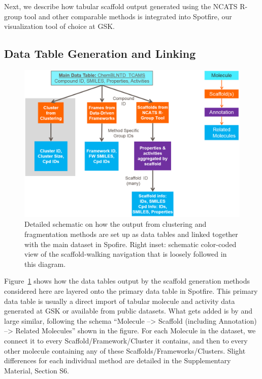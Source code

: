 \documentclass[journal=jacsat,manuscript=article]{achemso}
\newcommand*\fref[1]{Figure~\ref{fig:#1}}
\begin{document}
Next, we describe how tabular scaffold output generated using the
NCATS R-group tool and other comparable methods is integrated into
Spotfire, our visualization tool of choice at GSK. 

\subsection{Data Table Generation and Linking}

\begin{figure}
\includegraphics[width=6in]{fig/details_all3_noSNG.png}
\caption{Detailed schematic on how the output from clustering and
  fragmentation methods are set up as data tables and linked together
  with the main dataset in Spofire. Right inset: schematic color-coded
  view of the scaffold-walking navigation that is loosely followed in
  this diagram.}
\label{fig:detaildevil}
\end{figure}

\fref{detaildevil} shows how the data tables output by the scaffold
generation methods considered here are layered onto the primary data
table in Spotfire. This primary data table is usually a direct import
of tabular molecule and activity data generated at GSK or available
from public datasets. What gets added is by and large similar,
following the schema ``Molecule --> Scaffold (including Annotation)
--> Related Molecules'' shown in the figure. For each Molecule in the
dataset, we connect it to every Scaffold/Framework/Cluster it
contains, and then to every other molecule containing any of these
Scaffolds/Frameworks/Clusters. Slight differences for each individual
method are detailed in the Supplementary Material, Section S6.
\end{document}
